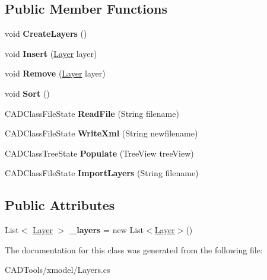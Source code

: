 \subsection*{Public Member Functions}
\begin{DoxyCompactItemize}
\item 
\mbox{\label{class_c_a_d_tools_1_1_layers_a86f7f155470e6c0d6869a4d3c3d6c2bf}} 
void {\bfseries Create\+Layers} ()
\item 
\mbox{\label{class_c_a_d_tools_1_1_layers_ac931a400701a98f9f100fd5bd4ffa00d}} 
void {\bfseries Insert} (\mbox{\hyperlink{class_c_a_d_tools_1_1_layer}{Layer}} layer)
\item 
\mbox{\label{class_c_a_d_tools_1_1_layers_ad5f35c5c9d51a3d5714a8eac685f3aba}} 
void {\bfseries Remove} (\mbox{\hyperlink{class_c_a_d_tools_1_1_layer}{Layer}} layer)
\item 
\mbox{\label{class_c_a_d_tools_1_1_layers_a5a92932b305dcdd00c4ce3efd87accb7}} 
void {\bfseries Sort} ()
\item 
\mbox{\label{class_c_a_d_tools_1_1_layers_a52b730caf38685432198642d18662355}} 
C\+A\+D\+Class\+File\+State {\bfseries Read\+File} (String filename)
\item 
\mbox{\label{class_c_a_d_tools_1_1_layers_acc22010627ead6edabe19ffb1fc71109}} 
C\+A\+D\+Class\+File\+State {\bfseries Write\+Xml} (String newfilename)
\item 
\mbox{\label{class_c_a_d_tools_1_1_layers_ad79225a2f67b69b540cda05ace2ea474}} 
C\+A\+D\+Class\+Tree\+State {\bfseries Populate} (Tree\+View tree\+View)
\item 
\mbox{\label{class_c_a_d_tools_1_1_layers_abffac6b14ebc16667c0ebb56e33eeb96}} 
C\+A\+D\+Class\+File\+State {\bfseries Import\+Layers} (String filename)
\end{DoxyCompactItemize}
\subsection*{Public Attributes}
\begin{DoxyCompactItemize}
\item 
\mbox{\label{class_c_a_d_tools_1_1_layers_a70d0a723ed91b9f48a0db61d271ba070}} 
List$<$ \mbox{\hyperlink{class_c_a_d_tools_1_1_layer}{Layer}} $>$ {\bfseries \+\_\+layers} = new List$<$\mbox{\hyperlink{class_c_a_d_tools_1_1_layer}{Layer}}$>$()
\end{DoxyCompactItemize}


The documentation for this class was generated from the following file\+:\begin{DoxyCompactItemize}
\item 
C\+A\+D\+Tools/xmodel/Layers.\+cs\end{DoxyCompactItemize}
